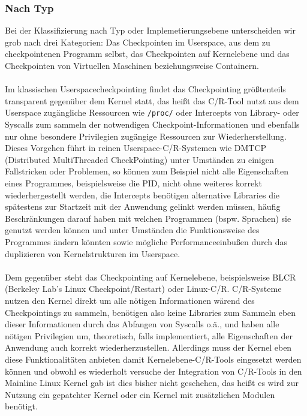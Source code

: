 \documentclass[a4paper]{article}
\begin{document}
\subsubsection{Nach Typ}
Bei der Klassifizierung nach Typ oder Implemetierungsebene unterscheiden wir grob nach drei Kategorien: Das Checkpointen im Userspace, aus dem zu checkpointenen Programm selbst, das Checkpointen auf Kernelebene und das Checkpointen von Virtuellen Maschinen beziehungsweise Containern.\\ \\
Im klassischen Userspacecheckpointing findet das Checkpointing größtenteils transparent gegenüber dem Kernel statt, das heißt das C/R-Tool nutzt aus dem Userspace zugängliche Ressourcen wie \texttt{/proc/} oder Intercepts von Library- oder Syscalls zum sammeln der notwendigen Checkpoint-Informationen und ebenfalls nur ohne besondere Privilegien zugängige Ressourcen zur Wiederherstellung. 
Dieses Vorgehen führt in reinen Userspace-C/R-Systemen wie DMTCP (Distributed MultiThreaded CheckPointing) unter Umständen zu einigen Fallstricken oder Problemen, so können zum Beispiel nicht alle Eigenschaften eines Programmes, beispielsweise die PID, nicht ohne weiteres korrekt wiederhergestellt werden, die Intercepts benötigen alternative Libraries die spätestens zur Startzeit mit der Anwendung gelinkt werden müssen, häufig Beschränkungen darauf haben mit welchen Programmen (bspw. Sprachen) sie genutzt werden können und unter Umständen die Funktionsweise des Programmes ändern könnten sowie mögliche Performanceeinbußen durch das duplizieren von Kernelstrukturen im Userspace.\\ \\
Dem gegenüber steht das Checkpointing auf Kernelebene, beispielsweise BLCR (Berkeley Lab's Linux Checkpoint/Restart) oder Linux-C/R.
C/R-Systeme nutzen den Kernel direkt um alle nötigen Informationen wärend des Checkpointings zu sammeln, benötigen also keine Libraries zum Sammeln eben dieser Informationen durch das Abfangen von Syscalls o.ä., und haben alle nötigen Privilegien um, theoretisch, falls implementiert, alle Eigenschaften der Anwendung auch korrekt wiederherzustellen. Allerdings muss der Kernel eben diese Funktionalitäten anbieten damit Kernelebene-C/R-Tools eingesetzt werden können und obwohl es wiederholt versuche der Integration von C/R-Tools in den Mainline Linux Kernel gab ist dies bisher nicht geschehen, das heißt es wird zur Nutzung ein gepatchter Kernel oder ein Kernel mit zusätzlichen Modulen benötigt.\\
\end{document}
